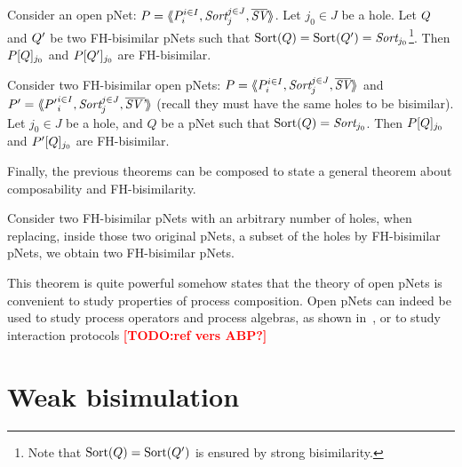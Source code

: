 \documentclass{lncs/llncs}
\newcommand{\TODO}[1]{\textcolor{red}{\textbf{[TODO:#1]}}}
\begin{document}
\begin{theorem}[Congruence]\label{thm-congr-eq}
	Consider an open pNet:
	$\pNet = \mylangle \pNet_i^{i\in I}, \Sort_j^{j\in J}, 
	\set{\symb{SV}}\myrangle$.
	Let $j_0\in J$ be a hole. Let $Q$ and $Q'$ be two FH-bisimilar pNets such that 
	$\Sortop(\pNetQ)=\Sortop(\pNetQ')=\Sort_{j_0}$\footnote{Note that $\operatorname{Sort}(Q)=\operatorname{Sort}(Q')$ is 
	ensured by 
	strong bisimilarity.}. Then 
	$P[Q]_{j_0}$ and 
	$P[Q']_{j_0}$ are FH-bisimilar.
\end{theorem}

\begin{theorem}\label{thm-ctxt-eq}
	Consider two FH-bisimilar open pNets:
	$\pNet = \mylangle \pNet_i^{i\in I}, \Sort_j^{j\in J}, 
	\set{\symb{SV}}\myrangle$ and 	$\pNet' = \mylangle {\pNet'}_i^{i\in I}, 
	\Sort_j^{j\in 
	J}, 	\set{\symb{SV'}}\myrangle$ 
	(recall they must have the same holes to be bisimilar).
	Let $j_0\in J$ be a hole, and $Q$ be a pNet such that $\Sortop(Q)=\Sort_{j_0}$. Then 
	$P[Q]_{j_0}$ and 
	$P'[Q]_{j_0}$ are FH-bisimilar.
\end{theorem}

Finally, the previous theorems can be composed to state a general theorem about 
composability and FH-bisimilarity.
\begin{theorem}[Composability]
	Consider two FH-bisimilar pNets with an arbitrary number of holes, when replacing, 
	inside those two original pNets, a subset of the holes by FH-bisimilar pNets, we 
	obtain two FH-bisimilar pNets.
\end{theorem}
This theorem is quite powerful somehow states that the theory of open pNets is convenient to study properties of process composition. Open pNets can indeed be used to study process operators and process algebras, as shown in~\cite{henrio:Forte2016}, or to study interaction protocols \TODO{ref vers ABP?}

\section{Weak bisimulation}\label{sec:weak}
\end{document}

